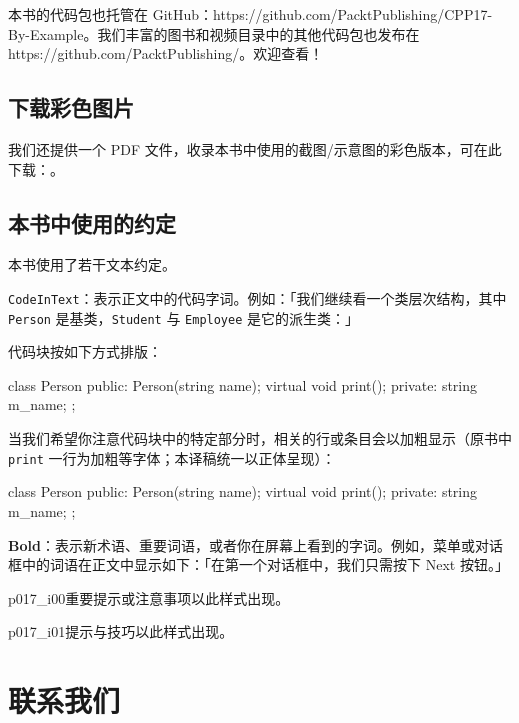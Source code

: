 本书的代码包也托管在 GitHub：https://github.com/PacktPublishing/CPP17-By-Example。我们丰富的图书和视频目录中的其他代码包也发布在 https://github.com/PacktPublishing/。欢迎查看！

\subsection*{下载彩色图片}

我们还提供一个 PDF 文件，收录本书中使用的截图/示意图的彩色版本，可在此下载：。

\subsection*{本书中使用的约定}

本书使用了若干文本约定。

\texttt{CodeInText}：表示正文中的代码字词。例如：「我们继续看一个类层次结构，其中 \texttt{Person} 是基类，\texttt{Student} 与 \texttt{Employee} 是它的派生类：」

代码块按如下方式排版：

\begin{codebox}
class Person {
   public:
     Person(string name);
     virtual void print();
   private:
     string m_name;
};
\end{codebox}

当我们希望你注意代码块中的特定部分时，相关的行或条目会以加粗显示（原书中 \texttt{print} 一行为加粗等字体；本译稿统一以正体呈现）：

\begin{codebox}
class Person {
   public:
     Person(string name);
     virtual void print();
   private:
     string m_name;
};
\end{codebox}

\textbf{Bold}：表示新术语、重要词语，或者你在屏幕上看到的字词。例如，菜单或对话框中的词语在正文中显示如下：「在第一个对话框中，我们只需按下 Next 按钮。」

\begin{myNotic}{p017_i00}{重要提示或注意事项以此样式出现。}
\end{myNotic}

\begin{myNotic}{p017_i01}{提示与技巧以此样式出现。}
\end{myNotic}

\section{联系我们}

